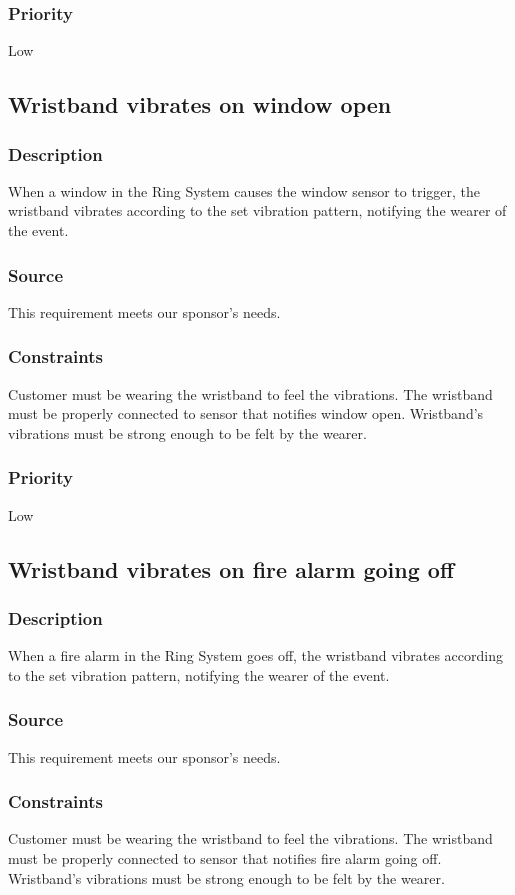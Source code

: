 \subsubsection{Priority}
Low

\subsection{Wristband vibrates on window open}
\subsubsection{Description}
When a window in the Ring System causes the window sensor to trigger, the wristband vibrates according to the set vibration pattern, notifying the wearer of the event.
\subsubsection{Source}
This requirement meets our sponsor's needs.
\subsubsection{Constraints}
Customer must be wearing the wristband to feel the vibrations.
The wristband must be properly connected to sensor that notifies window open. Wristband's vibrations must be strong enough to be felt by the wearer.
\subsubsection{Priority}
Low

\subsection{Wristband vibrates on fire alarm going off}
\subsubsection{Description}
When a fire alarm in the Ring System goes off, the wristband vibrates according to the set vibration pattern, notifying the wearer of the event.
\subsubsection{Source}
This requirement meets our sponsor's needs.
\subsubsection{Constraints}
Customer must be wearing the wristband to feel the vibrations.
The wristband must be properly connected to sensor that notifies fire alarm going off. Wristband's vibrations must be strong enough to be felt by the wearer.
